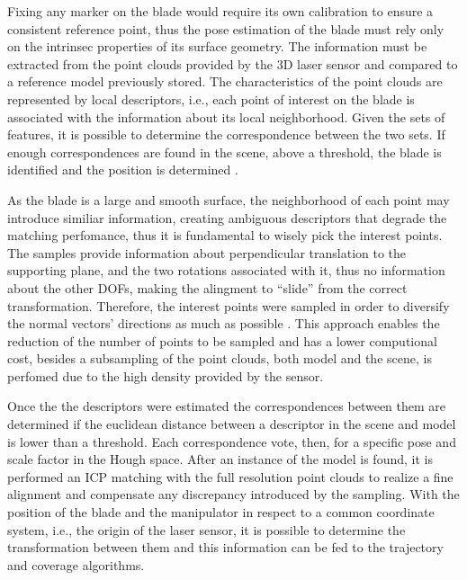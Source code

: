 Fixing any marker on the blade would require its own calibration to ensure a
consistent reference point, thus the pose estimation of the blade must rely only
on the intrinsec properties of its surface geometry. The information must be extracted from
the point clouds provided by the 3D laser sensor and compared to a reference
model previously stored. The characteristics of the point clouds are represented
by local descriptors, i.e., each point of interest on the blade is associated
with the information about its local neighborhood. Given the
sets of features,  it is possible to determine the correspondence between the
two sets. If enough correspondences are found in the scene, above a threshold,
the blade is identified and the position is determined \cite{Tombari2010a}. 

As the blade is a large and smooth surface, the neighborhood of each point may
introduce similiar information, creating ambiguous descriptors that degrade the
matching perfomance, thus it is fundamental to wisely pick the interest points.
The samples provide information about perpendicular translation to the
supporting plane, and the two rotations associated with it, thus no
information about the other DOFs, making the alingment to ``slide'' from the
correct transformation. Therefore, the interest points were sampled in order to
diversify the normal vectors' directions as much as possible
\cite{Rusinkiewicz2001}. This approach enables the reduction of the number of
points to be sampled and has a lower computional cost, besides a subsampling of
the point clouds, both model and the scene, is perfomed due to the high density
provided by the sensor.

Once the the descriptors were estimated the correspondences between them are
determined if the euclidean distance between a descriptor in the scene and model
is lower than a threshold. Each correspondence vote, then, for a specific pose
and scale factor in the Hough space. After an instance of the model is
found, it is performed an ICP matching with the full resolution point clouds to
realize a fine alignment and compensate any discrepancy introduced by the
sampling. With the position of the blade and the manipulator in respect to a
common coordinate system, i.e., the origin of the laser sensor, it is possible
to determine the transformation between them and this information can be fed to the
trajectory and coverage algorithms.



